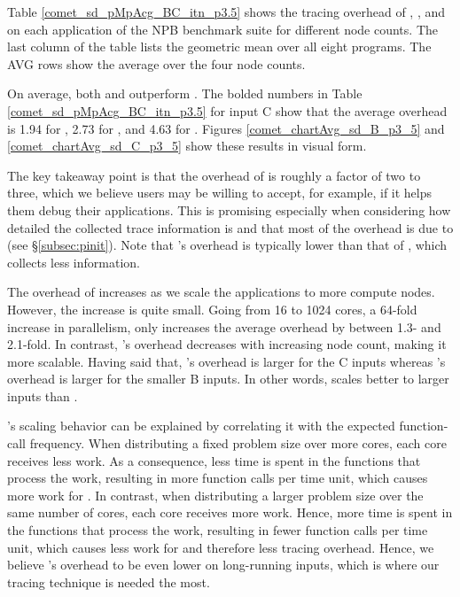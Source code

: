 Table \ref{comet_sd_pMpAcg_BC_itn_p3.5} shows the tracing overhead of \parlotm, \parlota, and \callgrind on each application of the NPB benchmark suite for different node counts. The last column of the table lists the geometric mean over all eight programs. The AVG rows show the average over the four node counts.


On average, both \parlotm and \parlota outperform \callgrind. The bolded numbers in Table \ref{comet_sd_pMpAcg_BC_itn_p3.5} for input C show that the average overhead is 1.94 for \parlotm, 2.73 for \parlota, and 4.63 for \callgrind. Figures \ref{comet_chartAvg_sd_B_p3_5} and \ref{comet_chartAvg_sd_C_p3_5} show these results in visual form.


The key takeaway point is that the overhead of \parlot is roughly a factor of two to three, which we believe users may be willing to accept, for example, if it helps them debug their applications. This is promising especially when considering how detailed the collected trace information is and that most of the overhead is due to \pin (see \S\ref{subsec:pinit}). Note that \parlot 's overhead is typically lower than that of \callgrind, which collects less information.

The overhead of \parlot increases as we scale the applications to more compute nodes. However, the increase is quite small. Going from 16 to 1024 cores, a 64-fold increase in parallelism, only increases the average overhead by between 1.3- and 2.1-fold. In contrast, \callgrind's overhead decreases with increasing node count, making it more scalable. Having said that, \callgrind's overhead is larger for the C inputs whereas \parlot 's overhead is larger for the smaller B inputs. In other words, \parlot scales better to larger inputs than \callgrind.

\parlot's scaling behavior can be explained by correlating it with the expected function-call frequency. When distributing a fixed problem size over more cores, each core receives less work. As a consequence, less time is spent in the functions that process the work, resulting in more function calls per time unit, which causes more work for \parlot. In contrast, when distributing a larger problem size over the same number of cores, each core receives more work. Hence, more time is spent in the functions that process the work, resulting in fewer function calls per time unit, which causes less work for \parlot and therefore less tracing overhead. Hence, we believe \parlot 's overhead to be even lower on long-running inputs, which is where our tracing technique is needed the most.


